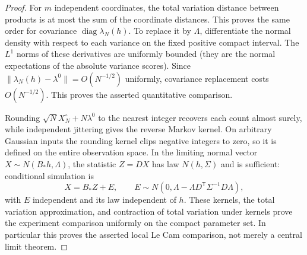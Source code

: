 \begin{proof}
For $m$ independent coordinates, the total variation distance between products is at most the sum of the coordinate distances. This proves the same order for covariance $\operatorname{diag}\lambda_N(h)$. To replace it by $\Lambda$, differentiate the normal density with respect to each variance on the fixed positive compact interval. The $L^1$ norms of these derivatives are uniformly bounded (they are the normal expectations of the absolute variance scores). Since $\|\lambda_N(h)-\lambda^0\|=O(N^{-1/2})$ uniformly, covariance replacement costs $O(N^{-1/2})$. This proves the asserted quantitative comparison.

Rounding $\sqrt N X_N^\circ+N\lambda^0$ to the nearest integer recovers each count almost surely, while independent jittering gives the reverse Markov kernel. On arbitrary Gaussian inputs the rounding kernel clips negative integers to zero, so it is defined on the entire observation space. In the limiting normal vector $X\sim N(B_*h,\Lambda)$, the statistic $Z=DX$ has law $N(h,\Sigma)$ and is sufficient: conditional simulation is
\[
 X=B_*Z+E,\qquad
 E\sim N(0,\Lambda-\Lambda D^{\mathsf T}\Sigma^{-1}D\Lambda),
\]
with $E$ independent and its law independent of $h$. These kernels, the total variation approximation, and contraction of total variation under kernels prove the experiment comparison uniformly on the compact parameter set. In particular this proves the asserted local Le Cam comparison, not merely a central limit theorem.
\end{proof}

